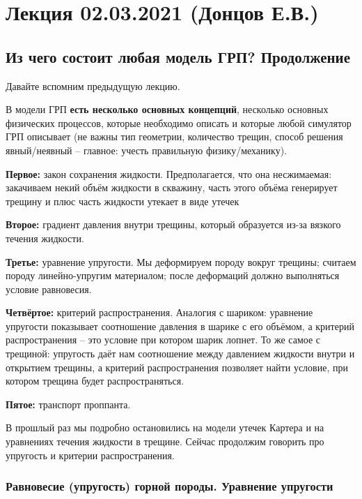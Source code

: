 \documentclass[main.tex]{subfiles}
\begin{document}

\section{Лекция 02.03.2021 (Донцов Е.В.)}

\subsection{Из чего состоит любая модель ГРП? Продолжение}

Давайте вспомним предыдущую лекцию.

В модели ГРП \textbf{есть несколько основных концепций}, несколько основных физических процессов, которые необходимо описать и которые любой симулятор ГРП описывает (не важны тип геометрии, количество трещин, способ решения явный/неявный -- главное: учесть правильную физику/механику).

\textbf{Первое:} закон сохранения жидкости.
Предполагается, что она несжимаемая: закачиваем некий объём жидкости в скважину, часть этого объёма генерирует трещину и плюс часть жидкости утекает в виде утечек

\textbf{Второе:} градиент давления внутри трещины, который образуется из-за вязкого течения жидкости.

\textbf{Третье:} уравнение упругости.
Мы деформируем породу вокруг трещины; считаем породу линейно-упругим материалом; после деформаций должно выполняться условие равновесия.

\textbf{Четвёртое:} критерий распространения.
Аналогия с шариком: уравнение упругости показывает соотношение давления в шарике с его объёмом, а критерий распространения -- это условие при котором шарик лопнет.
То же самое с трещиной: упругость даёт нам соотношение между давлением жидкости внутри и открытием трещины, а критерий распространения позволяет найти условие, при котором трещина будет распространяться.

\textbf{Пятое:} транспорт проппанта.

В прошлый раз мы подробно остановились на модели утечек Картера и на уравнениях течения жидкости в трещине.
Сейчас продолжим говорить про упругость и критерии распространения.

\subsubsection{Равновесие (упругость) горной породы. Уравнение упругости}
\end{document}
